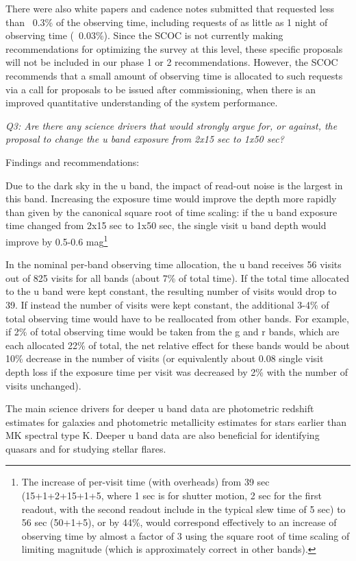 There were also white papers and cadence notes submitted that requested less than ~0.3\% of the observing time, including requests of as little as 1 night of observing time (~0.03\%). Since the SCOC is not currently making recommendations for optimizing the survey at this level, these specific proposals will not be included in our phase 1 or 2 recommendations. However, the SCOC recommends that a small amount of observing time is allocated to such requests via a call for proposals to be issued after commissioning, when there is an improved quantitative understanding of the system performance. 

{\it Q3:  Are there any science drivers that would strongly argue for, or against, the proposal to change the u band exposure from 2x15 sec to 1x50 sec? }

Findings and recommendations:

Due to the dark sky in the u band, the impact of read-out noise is the largest in this band. Increasing the exposure time would improve the depth more rapidly than given by the canonical  square root of time scaling: if the u band exposure time changed from 2x15 sec to 1x50 sec, the single visit u band depth would improve by 0.5-0.6 mag\footnote{The increase of per-visit time (with overheads) from 39 sec (15+1+2+15+1+5, where 1 sec is for shutter motion, 2 sec for the first readout, with the second readout include in the typical slew time of 5 sec) to 56 sec (50+1+5), or by 44\%, would correspond effectively to an increase of observing time by almost a factor of 3 using the square root of time scaling of limiting magnitude (which is approximately correct in other bands). }

In the nominal per-band observing time allocation, the u band receives 56 visits out of 825 visits for all bands (about 7\% of total time). If the total time allocated to the u band were kept constant, the resulting number of visits would drop to 39. If instead the number of visits were kept constant, the additional 3-4\% of total observing time would have to be reallocated from other bands. For example, if 2\% of total observing time would be taken from the g and r bands, which are each allocated 22\% of total, the net relative effect for these bands would be about 10\% decrease in the number of visits (or equivalently about 0.08 single visit depth loss if the exposure time per visit was decreased by 2\% with the number of visits unchanged). 

The main science drivers for deeper u band data are photometric redshift estimates for galaxies and photometric metallicity estimates for stars earlier than MK spectral type K.  Deeper u band data are also beneficial for identifying quasars and for studying stellar flares.


